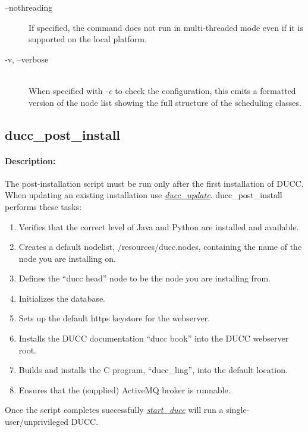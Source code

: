 \begin{description}
            \item[--nothreading] If specified, the command does not run in multi-threaded mode
              even if it is supported on the local platform.

            \item[-v, --verbose] \hfill \\
              When specified with {\em -c} to check the configuration, this emits a formatted version
              of the node list showing the full structure of the scheduling classes.
              

           \end{description}               


\subsection{ducc\_post\_install}
\label{subsec:admin.ducc-post-install}

    \paragraph{Description:}
    The post-installation script must be run only after the first installation of DUCC. 
    When updating an existing installation use \hyperref[subsec:admin.ducc-update]{\em ducc\_update}.
    ducc\_post\_install performs these tasks:
    \begin{enumerate}
      \item Verifies that the correct level of Java and Python are installed and available.
      \item Creates a default nodelist, \duccruntime/resources/ducc.nodes, containing the name of the node you are installing on.
      \item Defines the ``ducc head'' node to be the node you are installing from.
      \item Initializes the database.
      \item Sets up the default https keystore for the webserver.
      \item Installs the DUCC documentation ``ducc book'' into the DUCC webserver root.
      \item Builds and installs the C program, ``ducc\_ling'', into the default location.
      \item Ensures that the (supplied) ActiveMQ broker is runnable.
    \end{enumerate}

    Once the script completes successfully \hyperref[subsec:admin.start-ducc]{\em start\_ducc} will run a single-user/unprivileged DUCC.

